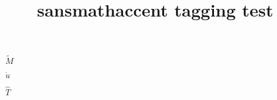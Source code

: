 \documentclass{article}
\title{sansmathaccent tagging test}
\begin{document}
$\tilde{M}$

$\dot{u}$

$\hat{T}$
\end{document}
